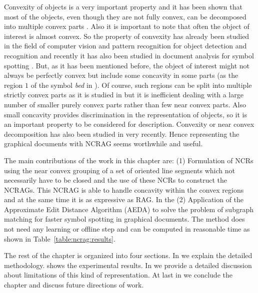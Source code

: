 Convexity of objects is a very important property and it has been shown that most of the objects, even though they are not fully convex, can be decomposed into multiple convex parts \cite{Jacobs1996}. Also it is important to note that often the object of interest is almost convex. So the property of convexity has already been studied in the field of computer vision and pattern recognition for object detection and recognition \cite{Lowe1987} and recently it has also been studied in document analysis for symbol spotting \cite{Nayef2011,LeBodic2012,Barducci2012}. But, as it has been mentioned before, the object of interest might not always be perfectly convex but include some concavity in some parts (as the region $1$ of the symbol \textit{bed} in ). Of course, such regions can be split into multiple strictly convex parts as it is studied in \cite{Jacobs1989,Jacobs1996} but it is inefficient dealing with a large number of smaller purely convex parts rather than few near convex parts. Also small concavity provides discrimination in the representation of objects, so it is an important property to be considered for description. Convexity or near convex decomposition has also been studied in \cite{Ren2011} very recently. Hence representing the graphical documents with NCRAG seems worthwhile and useful.

The main contributions of the work in this chapter are: (1) Formulation of NCRs using the near convex grouping of a set of oriented line segments which not necessarily have to be closed and the use of these NCRs to construct the NCRAGs. This NCRAG is able to handle concavity within the convex regions and at the same time it is as expressive as RAG. In the  (2) Application of the Approximate Edit Distance Algorithm (AEDA) \cite{Neuhaus2004} to solve the problem of subgraph matching for faster symbol spotting in graphical documents. The method does not need any learning or offline step and can be computed in reasonable time as shown in Table~\ref{table:ncrag:results}.

The rest of the chapter is organized into four sections. In  we explain the detailed methodology.  shows the experimental results. In  we provide a detailed discussion about limitations of this kind of representation. At last in  we conclude the chapter and discuss future directions of work.
